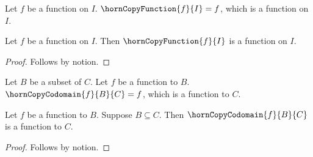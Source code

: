 

\begin{definition}\label{horn_copy_function}
    Let $f$ be a function on $I$.
    $\hornCopyFunction{f}{I}=f$, which is a function on $I$.
\end{definition}

\begin{proposition}\label{horn_copy_function_consumer}
    Let $f$ be a function on $I$.
    Then $\hornCopyFunction{f}{I}$ is a function on $I$.
\end{proposition}
\begin{proof}
    Follows by notion.
\end{proof}

\begin{definition}\label{horn_copy_codomain}
    Let $B$ be a subset of $C$.
    Let $f$ be a function to $B$.
    $\hornCopyCodomain{f}{B}{C}=f$, which is a function to $C$.
\end{definition}

\begin{proposition}\label{horn_copy_codomain_consumer}
    Let $f$ be a function to $B$.
    Suppose $B\subseteq C$.
    Then $\hornCopyCodomain{f}{B}{C}$ is a function to $C$.
\end{proposition}
\begin{proof}
    Follows by notion.
\end{proof}
